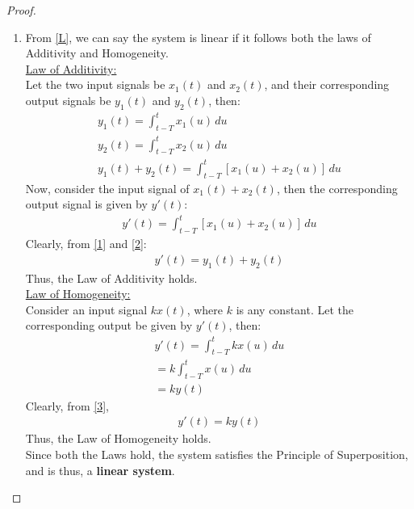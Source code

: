 \documentclass[journal,12pt,twocolumn]{IEEEtran}
\begin{document}
\begin{proof}
\begin{enumerate}
\item From \eqref{L}, we can say the system is linear if it follows both the laws of Additivity and Homogeneity.\\
\underline{Law of Additivity:}\\
Let the two input signals be $x_1(t)$ and $x_2(t)$, and their corresponding output signals be $y_1(t)$ and $y_2(t)$, then:
\begin{align}
    y_1(t) = \int_{t-T}^tx_1(u)\,du\\
    y_2(t) = \int_{t-T}^tx_2(u)\,du\\
    y_1(t) + y_2(t) = \int_{t-T}^t[x_1(u) + x_2(u)]\,du
    \label{1}
\end{align}
Now, consider the input signal of $x_1(t) + x_2(t)$, then the corresponding output signal is given by $y'(t)$:
\begin{align}
    y'(t) = \int_{t-T}^t[x_1(u) + x_2(u)]\,du
    \label{2}
\end{align}
Clearly, from \eqref{1} and \eqref{2}:
\begin{align}
    y'(t) = y_1(t) + y_2(t)
\end{align}
Thus, the Law of Additivity holds.\\

\underline{Law of Homogeneity: }\\
Consider an input signal $kx(t)$, where $k$ is any constant. Let the corresponding output be given by $y'(t)$, then:
\begin{align}
    y'(t) = \int_{t-T}^t kx(u)\,du\\
    = k\int_{t-T}^t x(u)\,du\\
     = ky(t)
     \label{3}
\end{align}
Clearly, from \eqref{3},
\begin{align}
    y'(t) = ky(t)
\end{align}
Thus, the Law of Homogeneity holds.\\

Since both the Laws hold, the system satisfies the Principle of Superposition, and is thus, a \textbf{linear system}.\\


\end{enumerate}
\end{proof}
\end{document}
